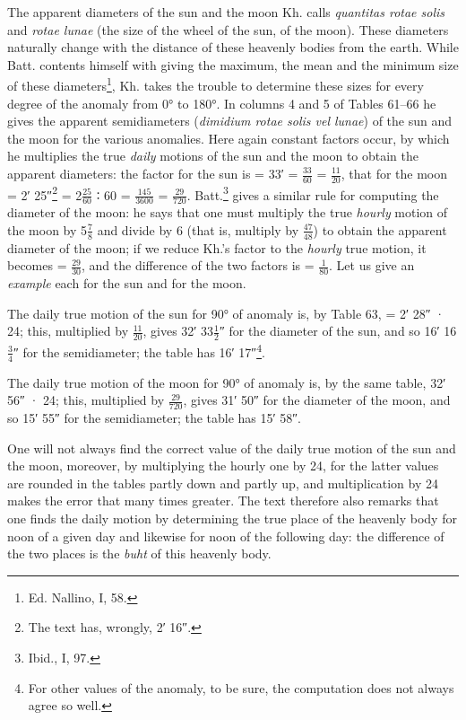 \documentclass[11pt]{article}
\newcommand{\Pg}[1]{\marginpar{\footnotesize\color{gray}#1}}
\begin{document}
\par \Pg{79}The apparent diameters of the sun and the moon Kh. calls \emph{quantitas rotae solis} and \emph{rotae lunae} (the size of the wheel of the sun, of the moon). These diameters naturally change with the distance of these heavenly bodies from the earth. While Batt. contents himself with giving the maximum, the mean and the minimum size of these diameters\footnote{Ed. Nallino, I, 58.}, Kh. takes the trouble to determine these sizes for every degree of the anomaly from 0° to 180°. In columns 4 and 5 of Tables 61–66 he gives the apparent semidiameters (\emph{dimidium rotae solis vel lunae}) of the sun and the moon for the various anomalies. Here again constant factors occur, by which he multiplies the true \emph{daily} motions of the sun and the moon to obtain the apparent diameters: the factor for the sun is = 33′ = $\tfrac{33}{60}$ = $\tfrac{11}{20}$, that for the moon = 2′ 25″\footnote{The text has, wrongly, 2′ 16″.} = 2$\tfrac{25}{60}$ {\SignFont\upshape ∶} 60 = $\tfrac{145}{3600}$ = $\tfrac{29}{720}$. Batt.\footnote{Ibid., I, 97.} gives a similar rule for computing the diameter of the moon: he says that one must multiply the true \emph{hourly} motion of the moon by 5$\tfrac{7}{8}$ and divide by 6 (that is, multiply by $\tfrac{47}{48}$) to obtain the apparent diameter of the moon; if we reduce Kh.'s factor to the \emph{hourly} true motion, it becomes = $\tfrac{29}{30}$, and the difference of the two factors is = $\tfrac{1}{80}$. Let us give an \emph{example} each for the sun and for the moon.\par
\par The daily true motion of the sun for 90° of anomaly is, by Table 63, = 2′ 28″ · 24; this, multiplied by $\tfrac{11}{20}$, gives 32′ 33$\tfrac{1}{2}$″ for the diameter of the sun, and so 16′ 16$\tfrac{3}{4}$″ for the semidiameter; the table has 16′ 17″\footnote{For other values of the anomaly, to be sure, the computation does not always agree so well.}.\par
\par The daily true motion of the moon for 90° of anomaly is, by the same table, 32′ 56″ · 24; this, multiplied by $\tfrac{29}{720}$, gives 31′ 50″ for the diameter of the moon, and so 15′ 55″ for the semidiameter; the table has 15′ 58″.\par
\par One will not always find the correct value of the daily true motion of the sun and the moon, moreover, by multiplying the hourly one by 24, for the latter values are rounded in the tables partly down and partly up, and multiplication by 24 makes the error that many times greater. The text therefore also remarks that one finds the daily motion by determining the true place of the heavenly body for noon of a given day and likewise for noon of the following day: the difference of the two places is the \emph{buht} of this heavenly body.\par
\end{document}
